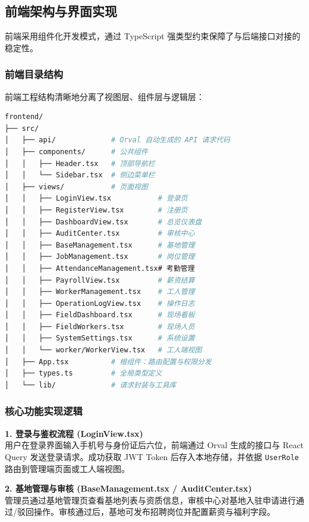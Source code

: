 \documentclass[UTF8,a4paper,12pt]{article}
\begin{document}
\subsection{前端架构与界面实现}
前端采用组件化开发模式，通过 TypeScript 强类型约束保障了与后端接口对接的稳定性。

\subsubsection{前端目录结构}
前端工程结构清晰地分离了视图层、组件层与逻辑层：

\begin{lstlisting}[language=bash, caption={前端工程目录结构}, label={code:frontend_structure}]
frontend/
├── src/
│   ├── api/             # Orval 自动生成的 API 请求代码
│   ├── components/      # 公共组件
│   │   ├── Header.tsx   # 顶部导航栏
│   │   └── Sidebar.tsx  # 侧边菜单栏
│   ├── views/           # 页面视图
│   │   ├── LoginView.tsx           # 登录页
│   │   ├── RegisterView.tsx        # 注册页
│   │   ├── DashboardView.tsx       # 总览仪表盘
│   │   ├── AuditCenter.tsx         # 审核中心
│   │   ├── BaseManagement.tsx      # 基地管理
│   │   ├── JobManagement.tsx       # 岗位管理
│   │   ├── AttendanceManagement.tsx# 考勤管理
│   │   ├── PayrollView.tsx         # 薪资结算
│   │   ├── WorkerManagement.tsx    # 工人管理
│   │   ├── OperationLogView.tsx    # 操作日志
│   │   ├── FieldDashboard.tsx      # 现场看板
│   │   ├── FieldWorkers.tsx        # 现场人员
│   │   ├── SystemSettings.tsx      # 系统设置
│   │   └── worker/WorkerView.tsx   # 工人端视图
│   ├── App.tsx          # 根组件：路由配置与权限分发
│   ├── types.ts         # 全局类型定义
│   └── lib/             # 请求封装与工具库
\end{lstlisting}

\subsubsection{核心功能实现逻辑}

\textbf{1. 登录与鉴权流程 (LoginView.tsx)} \\
用户在登录界面输入手机号与身份证后六位，前端通过 Orval 生成的接口与 React Query 发送登录请求。成功获取 JWT Token 后存入本地存储，并依据 \texttt{UserRole} 路由到管理端页面或工人端视图。

\textbf{2. 基地管理与审核 (BaseManagement.tsx / AuditCenter.tsx)} \\
管理员通过基地管理页查看基地列表与资质信息，审核中心对基地入驻申请进行通过/驳回操作。审核通过后，基地可发布招聘岗位并配置薪资与福利字段。
\end{document}
